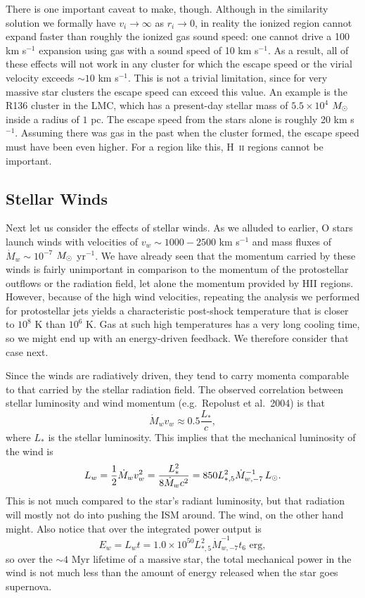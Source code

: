 There is one important caveat to make, though. Although in the similarity solution we formally have $v_i \rightarrow \infty$ as $r_i \rightarrow 0$, in reality the ionized region cannot expand faster than roughly the ionized gas sound speed: one cannot drive a 100 km s$^{-1}$ expansion using gas with a sound speed of 10 km s$^{-1}$. As a result, all of these effects will not work in any cluster for which the escape speed or the virial velocity exceeds $\sim 10$ km s$^{-1}$. This is not a trivial limitation, since for very massive star clusters the escape speed can exceed this value. An example is the R136 cluster in the LMC, which has a present-day stellar mass of $5.5\times 10^4$ $M_{\odot}$ inside a radius of $1$ pc. The escape speed from the stars alone is roughly 20 km s$^{-1}$. Assuming there was gas in the past when the cluster formed, the escape speed must have been even higher. For a region like this, H~\textsc{ii} regions cannot be important.

\subsection{Stellar Winds}

Next let us consider the effects of stellar winds. As we alluded to earlier, O stars launch winds with velocities of $v_w \sim 1000-2500$ km s$^{-1}$ and mass fluxes of $\dot{M}_w \sim 10^{-7}$ $M_{\odot}$ yr$^{-1}$. We have already seen that the momentum carried by these winds is fairly unimportant in comparison to the momentum of the protostellar outflows or the radiation field, let alone the momentum provided by HII regions. However, because of the high wind velocities, repeating the analysis we performed for protostellar jets yields a characteristic post-shock temperature that is closer to $10^8$ K than $10^6$ K. Gas at such high temperatures has a very long cooling time, so we might end up with an energy-driven feedback. We therefore consider that case next.

Since the winds are radiatively driven, they tend to carry momenta comparable to that carried by the stellar radiation field. The observed correlation between stellar luminosity and wind momentum (e.g.\ Repolust et al.~2004) is that
\begin{equation}
\dot{M}_w v_w \approx 0.5 \frac{L_*}{c},
\end{equation}
where $L_*$ is the stellar luminosity. This implies that the mechanical luminosity of the wind is
\begin{equation}
L_w = \frac{1}{2} \dot{M}_w v_w^2 = \frac{L_*^2}{8 \dot{M}_w c^2} = 850 L_{*,5}^2 \dot{M}_{w,-7}^{-1} \, L_{\odot}.
\end{equation}
This is not much compared to the star's radiant luminosity, but that radiation will mostly not do into pushing the ISM around. The wind, on the other hand might. Also notice that over the integrated power output is
\begin{equation}
E_w = L_w t = 1.0\times 10^{50}  L_{*,5}^2 \dot{M}_{w,-7}^{-1} t_6\mbox{ erg},
\end{equation}
so over the $\sim 4$ Myr lifetime of a massive star, the total mechanical power in the wind is not much less than the amount of energy released when the star goes supernova.

